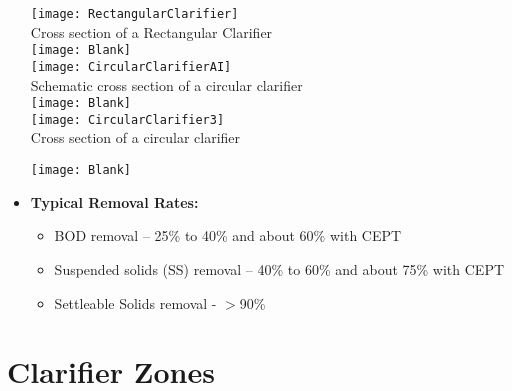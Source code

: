 \begin{itemize}
			\begin{center}
				\texttt{[image: RectangularClarifier]}\\
				Cross section of a Rectangular Clarifier\\

				\texttt{[image: Blank]}\\
				\texttt{[image: CircularClarifierAI]}\\
				Schematic cross section of a circular clarifier\\
				\texttt{[image: Blank]}\\
				\texttt{[image: CircularClarifier3]}\\
				Cross section of a circular clarifier\\
			\end{center}
				\texttt{[image: Blank]}\\
\item \textbf{Typical Removal Rates:}\\
\begin{itemize}
\item \hspace{10mm} BOD removal – 25\% to 40\% and about 60\% with CEPT
\item \hspace{10mm} Suspended solids (SS) removal – 40\% to 60\% and about 75\% with CEPT
\item \hspace{10mm} Settleable Solids removal - $>$90\%
\end{itemize}
\end{itemize}

\section{Clarifier Zones}
				
